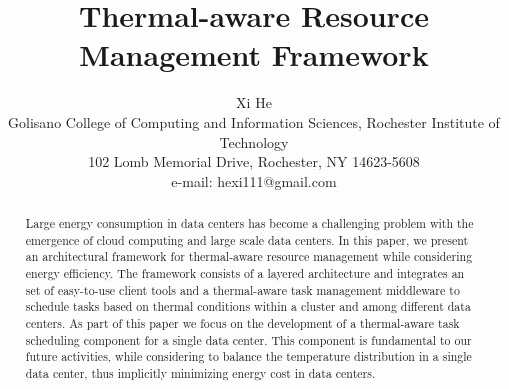 \newcommand{\E}[1]{\footnote{{\color{red}\em  some error}}}
\newcommand{\GVL}[1]{{\color{red}\em  GVL: #1}~}
\newcommand{\WANG}[1]{{\color{blue}\em  WANG: #1}~}
\newcommand{\YOUNGE}[1]{{\color{blue}\em  YOUNGE: #1}~}

\newcommand{\AUTHOR}{Xi He\\
\small Golisano College of Computing and Information Sciences, Rochester Institute of Technology\\
\small 102 Lomb Memorial Drive, Rochester, NY 14623-5608\\
\small e-mail: hexi111@gmail.com
}
\newcommand{\TITLE}{Thermal-aware Resource Management Framework}


\title{\TITLE}
\author{\AUTHOR}

\maketitle





\begin{abstract}
Large energy consumption in data centers has become a challenging problem with the emergence of cloud computing and large scale data centers. In this paper, we present an architectural framework for thermal-aware resource management while considering energy efficiency. The framework consists of a layered architecture and integrates 
an set of easy-to-use client tools and a thermal-aware task management middleware to schedule tasks based on thermal conditions within a cluster and among different data centers. As part of this paper we focus on the development of a thermal-aware task scheduling component for a single data center. This component is fundamental to our future activities, while considering to balance the temperature distribution in a single data center, thus implicitly minimizing energy cost in data centers. 
\end{abstract}

